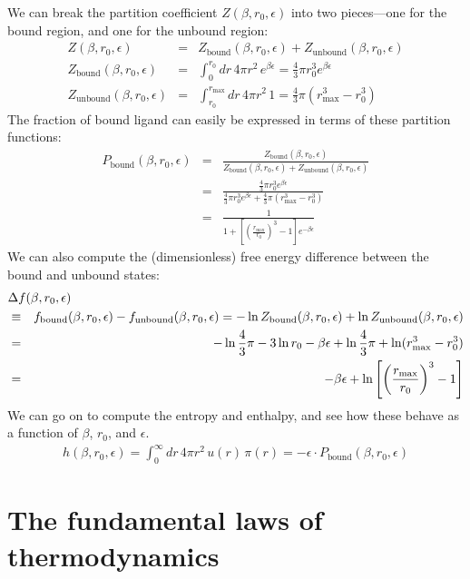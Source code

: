 \documentclass[english,course]{lecture}
\begin{document}
We can break the partition coefficient $Z(\beta, r_0, \epsilon)$ into two pieces---one for the bound region, and one for the unbound region:
\begin{eqnarray}
Z(\beta, r_0, \epsilon) &=& Z_\mathrm{bound}(\beta, r_0, \epsilon) + Z_\mathrm{unbound}(\beta, r_0, \epsilon) \\
Z_\mathrm{bound}(\beta, r_0, \epsilon) &=& \int_0^{r_0} dr \, 4 \pi r^2 \, e^{\beta \epsilon} = \frac{4}{3} \pi r_0^3 e^{\beta \epsilon} \\
Z_\mathrm{unbound}(\beta, r_0, \epsilon) &=& \int_{r_0}^{r_\mathrm{max}} dr \, 4 \pi r^2 \, 1 = \frac{4}{3} \pi (r_\mathrm{max}^3 - r_0^3)
\end{eqnarray}
The fraction of bound ligand can easily be expressed in terms of these partition functions:
\begin{eqnarray}
P_\mathrm{bound}(\beta, r_0, \epsilon) &=& \frac{Z_\mathrm{bound}(\beta, r_0, \epsilon)}{Z_\mathrm{bound}(\beta, r_0, \epsilon) + Z_\mathrm{unbound}(\beta, r_0, \epsilon)} \\
&=& \frac{\frac{4}{3} \pi r_0^3 e^{\beta \epsilon}}{\frac{4}{3} \pi r_0^3 e^{\beta \epsilon} + \frac{4}{3} \pi (r_\mathrm{max}^3 - r_0^3)} \\
&=& \frac{1}{1 + \left[\left(\frac{r_\mathrm{max}}{r_0}\right)^3 - 1\right] e^{-\beta \epsilon}}
\end{eqnarray}
We can also compute the (dimensionless) free energy difference between the bound and unbound states:
\begin{eqnarray}
\lefteqn{\Delta f(\beta, r_0, \epsilon)} \\
&\equiv& f_\mathrm{bound}(\beta, r_0, \epsilon) - f_\mathrm{unbound}(\beta, r_0, \epsilon) = - \ln Z_\mathrm{bound}(\beta, r_0, \epsilon) + \ln Z_\mathrm{unbound}(\beta, r_0, \epsilon) \\
&=& - \ln \frac{4}{3}\pi - 3 \ln r_0 - \beta \epsilon + \ln \frac{4}{3}\pi + \ln (r_\mathrm{max}^3 - r_0^3) \\
&=& - \beta \epsilon + \ln \left[ \left(\frac{r_\mathrm{max}}{r_0}\right)^3 - 1 \right]
\end{eqnarray}
We can go on to compute the entropy and enthalpy, and see how these behave as a function of $\beta$, $r_0$, and $\epsilon$.
\begin{eqnarray}
h(\beta, r_0, \epsilon) = \int_0^\infty dr \, 4 \pi r^2 \, u(r) \, \pi(r) = -\epsilon \cdot P_\mathrm{bound}(\beta, r_0, \epsilon)
\end{eqnarray}

\section{The fundamental laws of thermodynamics}
\end{document}
